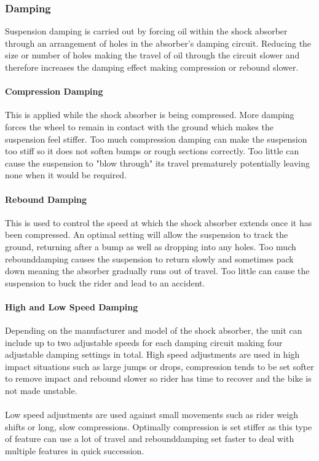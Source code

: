 	\subsubsection{Damping}
		Suspension damping is carried out by forcing oil within the shock absorber through an arrangement of holes in the absorber's damping circuit. Reducing the size or number of holes making the travel of oil through the circuit slower and therefore increases the damping effect making compression or rebound slower.
	\paragraph{Compression Damping} 
		This is applied while the shock absorber is being compressed. More damping forces the wheel to remain in contact with the ground which makes the suspension feel stiffer. Too much compression damping can make the suspension too stiff so it does not soften bumps or rough sections correctly. Too little can cause the suspension to "blow through" its travel prematurely potentially leaving none when it would be required.
	\paragraph{Rebound Damping}
		This is used to control the speed at which the shock absorber extends once it has been compressed. An optimal setting will allow the suspension to track the ground, returning after a bump as well as dropping into any holes. Too much \gls{rebounddamping} causes the suspension to return slowly and sometimes pack down meaning the absorber gradually runs out of travel. Too little can cause the suspension to buck the rider and lead to an accident.
	\paragraph{High and Low Speed Damping} 
		Depending on the manufacturer and model of the shock absorber, the unit can include up to two adjustable speeds for each damping circuit making four adjustable damping settings in total. High speed adjustments are used in high impact situations such as large jumps or drops, compression tends to be set softer to remove impact and rebound slower so rider has time to recover and the bike is not made unstable.
		\\\\
		Low speed adjustments are used against small movements such as rider weigh shifts or long, slow compressions. Optimally compression is set stiffer as this type of feature can use a lot of travel and \gls{rebounddamping} set faster to deal with multiple features in quick succession.
